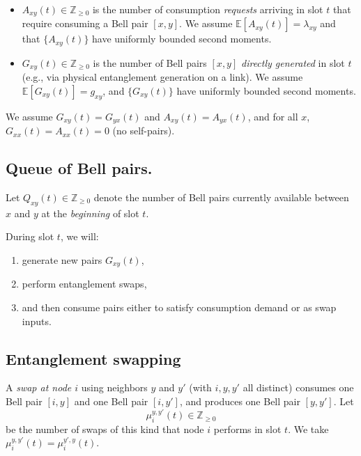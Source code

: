\documentclass[11pt]{article}
\newcommand{\E}{\mathbb{E}}
\begin{document}
\begin{itemize}[leftmargin=2em]
\item $A_{xy}(t)\in\mathbb{Z}_{\ge 0}$ is the number of consumption \emph{requests} arriving in slot $t$ that require consuming a Bell pair $[x,y]$. We assume $\E[A_{xy}(t)]=\lambda_{xy}$ and that $\{A_{xy}(t)\}$ have uniformly bounded second moments.
\item $G_{xy}(t)\in\mathbb{Z}_{\ge 0}$ is the number of Bell pairs $[x,y]$ \emph{directly generated} in slot $t$ (e.g., via physical entanglement generation on a link). We assume $\E[G_{xy}(t)]=g_{xy}$, and $\{G_{xy}(t)\}$ have uniformly bounded second moments.
\end{itemize}

We assume $G_{xy}(t)=G_{yx}(t)$ and $A_{xy}(t)=A_{yx}(t)$, and for all $x$, $G_{xx}(t)=A_{xx}(t)=0$ (no self-pairs).

\subsection{Queue of Bell pairs.} Let $Q_{xy}(t)\in\mathbb{Z}_{\ge 0}$ denote the number of Bell pairs currently available between $x$ and $y$ at the \emph{beginning} of slot $t$. 

During slot $t$, we will:
\begin{enumerate}[leftmargin=2em,label=(\alph*)]
\item generate new pairs $G_{xy}(t)$,
\item perform entanglement swaps,
\item and then consume pairs either to satisfy consumption demand or as swap inputs.
\end{enumerate}

\subsection{Entanglement swapping}

A \emph{swap at node $i$} using neighbors $y$ and $y'$ (with $i,y,y'$ all distinct) consumes one Bell pair $[i,y]$ and one Bell pair $[i,y']$, and produces one Bell pair $[y,y']$. Let
\[
\mu_i^{y,y'}(t)\in\mathbb{Z}_{\ge 0}
\]
be the number of swaps of this kind that node $i$ performs in slot $t$. We take $\mu_i^{y,y'}(t)=\mu_i^{y',y}(t)$.
\end{document}

